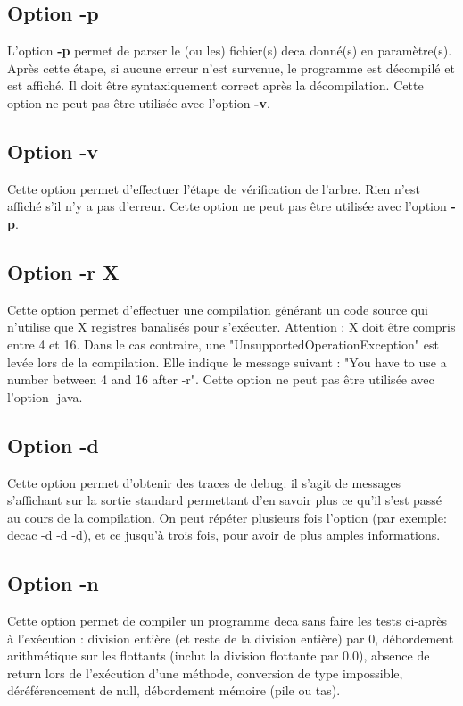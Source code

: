 \documentclass[12pt, a4paper, one side]{article}
\begin{document}
\subsection{Option -p}

L'option \textbf{-p} permet de parser le (ou les) fichier(s) deca donné(s) en paramètre(s).
Après cette étape, si aucune erreur n'est survenue, le programme est décompilé et est
affiché. Il doit être syntaxiquement correct après la décompilation. Cette option ne peut
pas être utilisée avec l'option \textbf{-v}.

\subsection{Option -v}

Cette option permet d'effectuer l'étape de vérification de l'arbre. Rien n'est affiché s'il
n'y a pas d'erreur. Cette option ne peut pas être utilisée avec l'option \textbf{-p}.

\subsection{Option -r X}
Cette option permet d'effectuer une compilation générant un code source qui n'utilise que X registres banalisés pour s’exécuter. Attention : X doit être compris entre 4 et 16. Dans le cas contraire, une "UnsupportedOperationException" est levée lors de la compilation. Elle indique le message suivant : "You have to use a number between 4 and 16 after -r".
Cette option ne peut pas être utilisée avec l'option -java.

\subsection{Option -d}

Cette option permet d'obtenir des traces de debug: il s'agit de messages s'affichant sur la sortie standard permettant d'en savoir plus ce qu'il s'est passé au cours de la compilation. On peut répéter plusieurs fois l'option (par exemple: decac -d -d -d), et ce jusqu'à trois fois, pour avoir de plus amples informations.

\subsection{Option -n}

Cette option permet de compiler un programme deca sans faire les tests ci-après à l’exécution : division entière (et reste de la division entière) par 0, débordement arithmétique sur les flottants (inclut la division flottante par 0.0), absence de return lors de l’exécution d’une méthode, conversion de type impossible, déréférencement de null, débordement mémoire (pile ou tas).
\end{document}
